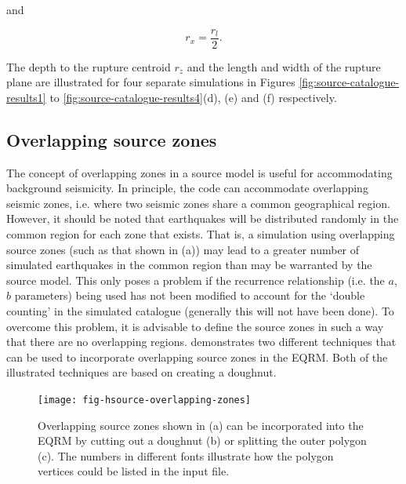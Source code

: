 and

\begin{equation}
r_x = \frac{r_l}{2}.
\end{equation}


The depth to the rupture centroid $r_z$ and the length and width
of the rupture plane are illustrated for four separate simulations
in Figures \ref{fig:source-catalogue-results1} to \ref{fig:source-catalogue-results4}(d),
(e) and (f) respectively.

\subsection{Overlapping source zones}

The concept of overlapping zones in a source model is useful for
accommodating background seismicity. In principle, the code can
accommodate overlapping seismic zones, i.e. where two seismic
zones share a common geographical region. However, it should be
noted that earthquakes will be distributed randomly in the common
region for each zone that exists. That is, a simulation using
overlapping source zones (such as that shown in
(a)) may lead to a greater number
of simulated earthquakes in the common
region than may be warranted by the source model. This only poses
a problem if the recurrence relationship (i.e. the $a$, $b$
parameters) being used has not been modified to account for the
`double counting' in the simulated catalogue (generally this will
not have been done). To overcome this problem, it is advisable to
define the source zones in such a way that there are no
overlapping regions.  demonstrates
two different techniques that can be used to incorporate
overlapping source zones in the EQRM. Both of the illustrated
techniques are based on creating a doughnut.

\begin{figure}[htp]
\texttt{[image: fig-hsource-overlapping-zones]}
\caption{Overlapping source zones shown in (a) can be incorporated
into the EQRM by cutting out a doughnut (b) or splitting the outer
polygon (c). The numbers in different fonts illustrate how the
polygon vertices could be listed in the input file.
} \label{fig:h-source-overlapping}
\end{figure}




